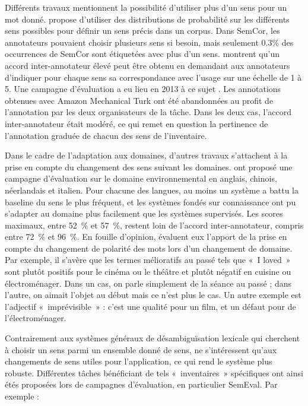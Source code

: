Différents travaux mentionnent la possibilité d'utiliser plus d'un sens pour un
mot donné. \cite{smith2011rumble} propose d'utiliser des distributions de
probabilité sur les différents sens possibles pour définir un sens précis dans
un corpus. Dans SemCor, les annotateurs pouvaient choisir plusieurs sens si
besoin, mais seulement 0.3\% des occurrences de SemCor sont étiquetées avec
plus d'un sens. \cite{erk2013measuring} montrent qu'un accord inter-annotateur
élevé peut être obtenu en demandant aux annotateurs d'indiquer pour chaque sens
sa correspondance avec l'usage sur une échelle de 1 à 5. Une campagne
d'évaluation a eu lieu en 2013 à ce sujet \citep{jurgens2013semeval}. Les
annotations obtenues avec Amazon Mechanical Turk ont été abandonnées au profit
de l'annotation par les deux organisateurs de la tâche. Dans les deux cas,
l'accord inter-annotateur était modéré, ce qui remet en question la pertinence
de l'annotation graduée de chacun des sens de l'inventaire.

Dans le cadre de l'adaptation aux domaines, d'autres travaux s'attachent à la
prise en compte du changement des sens suivant les domaines.
\cite{agirre2010semeval17} ont proposé une campagne d'évaluation sur le domaine
environnemental en anglais, chinois, néerlandais et italien. Pour chacune des
langues, au moins un système a battu la baseline du sens le plus fréquent, et
les systèmes fondés sur connaissance ont pu s'adapter au domaine plus
facilement que les systèmes supervisés. Les scores maximaux, entre 52~\% et
57~\%, restent loin de l'accord inter-annotateur, compris entre 72~\% et 96~\%.
En fouille d'opinion, \cite{marchand2014influence} évaluent eux l'apport de la
prise en compte du changement de polarité des mots lors d'un changement de
domaine. Par exemple, il s'avère que les termes mélioratifs au passé tels que
«~I loved~» sont plutôt positifs pour le cinéma ou le théâtre et plutôt négatif
en cuisine ou électroménager. Dans un cas, on parle simplement de la séance au
passé ; dans l'autre, on aimait l'objet au début mais ce n'est plus le cas. Un
autre exemple est l'adjectif «~imprévisible~» : c'est une qualité pour un film,
et un défaut pour de l'électroménager.

Contrairement aux systèmes généraux de désambiguïsation lexicale qui cherchent
à choisir un sens parmi un ensemble donné de sens, \cite{marchand2014influence}
ne s'intéressent qu'aux changements de sens utiles pour l'application, ce qui
rend le système plus robuste. Différentes tâches bénéficiant de tels
«~inventaires~» spécifiques ont ainsi étés proposées lors de campagnes
d'évaluation, en particulier SemEval. Par exemple :


